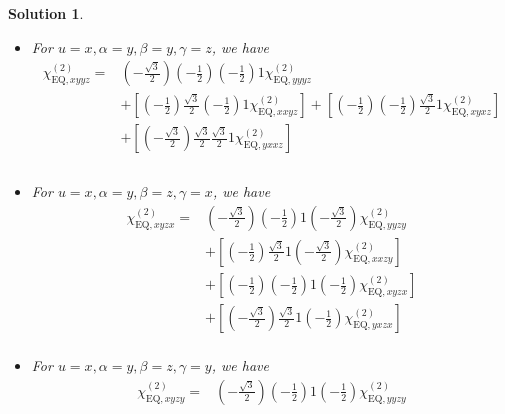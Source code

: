 \documentclass[UTF8,10pt,a4paper]{article}
\theoremstyle{Problem}
\theoremstyle{Solution}
\newtheorem*{sol}{Solution}
\begin{document}
\begin{sol}
\begin{itemize}
\begin{align}
\nonumber&+\left[\left(-\frac{\sqrt{3}}{2}\right)\frac{\sqrt{3}}{2}\left(-\frac{1}{2}\right)\frac{\sqrt{3}}{2}\chi_{\text{EQ},yxyx}^{(2)}\right]+\left[\left(-\frac{\sqrt{3}}{2}\right)\left(-\frac{1}{2}\right)\frac{\sqrt{3}}{2}\frac{\sqrt{3}}{2}\chi_{\text{EQ},yyxx}^{(2)}\right]\\
&+\left[\left(-\frac{1}{2}\right)\frac{\sqrt{3}}{2}\frac{\sqrt{3}}{2}\frac{\sqrt{3}}{2}\chi_{\text{EQ},xxxx}^{(2)}\right]
\end{align}\normalsize
\item For $u=x,\alpha=y,\beta=y,\gamma=z$, we have
\footnotesize\begin{align}
\nonumber\chi_{\text{EQ},xyyz}^{(2)}=&\left(-\frac{\sqrt{3}}{2}\right)\left(-\frac{1}{2}\right)\left(-\frac{1}{2}\right)1\chi_{\text{EQ},yyyz}^{(2)}\\
\nonumber&+\left[\left(-\frac{1}{2}\right)\frac{\sqrt{3}}{2}\left(-\frac{1}{2}\right)1\chi_{\text{EQ},xxyz}^{(2)}\right]+\left[\left(-\frac{1}{2}\right)\left(-\frac{1}{2}\right)\frac{\sqrt{3}}{2}1\chi_{\text{EQ},xyxz}^{(2)}\right]\\
\nonumber&+\left[\left(-\frac{\sqrt{3}}{2}\right)\frac{\sqrt{3}}{2}\frac{\sqrt{3}}{2}1\chi_{\text{EQ},yxxz}^{(2)}\right]\\
\nonumber&\\
&
\end{align}\normalsize
\item For $u=x,\alpha=y,\beta=z,\gamma=x$, we have
\footnotesize\begin{align}
\nonumber\chi_{\text{EQ},xyzx}^{(2)}=&\left(-\frac{\sqrt{3}}{2}\right)\left(-\frac{1}{2}\right)1\left(-\frac{\sqrt{3}}{2}\right)\chi_{\text{EQ},yyzy}^{(2)}\\
\nonumber&+\left[\left(-\frac{1}{2}\right)\frac{\sqrt{3}}{2}1\left(-\frac{\sqrt{3}}{2}\right)\chi_{\text{EQ},xxzy}^{(2)}\right]\\
\nonumber&+\left[\left(-\frac{1}{2}\right)\left(-\frac{1}{2}\right)1\left(-\frac{1}{2}\right)\chi_{\text{EQ},xyzx}^{(2)}\right]\\
\nonumber&+\left[\left(-\frac{\sqrt{3}}{2}\right)\frac{\sqrt{3}}{2}1\left(-\frac{1}{2}\right)\chi_{\text{EQ},yxzx}^{(2)}\right]\\
&
\end{align}\normalsize
\item For $u=x,\alpha=y,\beta=z,\gamma=y$, we have
\footnotesize\begin{align}
\nonumber\chi_{\text{EQ},xyzy}^{(2)}=&\left(-\frac{\sqrt{3}}{2}\right)\left(-\frac{1}{2}\right)1\left(-\frac{1}{2}\right)\chi_{\text{EQ},yyzy}^{(2)}\\

\end{align}
\end{itemize}
\end{sol}
\end{document}
